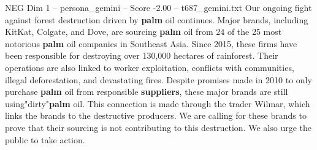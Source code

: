 \begin{textsample}{NEG Dim 1 – persona\_gemini – Score -2.00 – t687\_gemini.txt}  \label{ex:f1_neg_008}
Our ongoing fight against forest destruction driven by \textbf{palm} oil continues.
Major brands, including KitKat, Colgate, and Dove, are sourcing \textbf{palm} oil from 24 of the 25 most notorious \textbf{palm} oil companies in Southeast Asia.
Since 2015, these firms have been responsible for destroying over 130,000 hectares of rainforest.
Their operations are also linked to worker exploitation, conflicts with communities, illegal deforestation, and devastating fires.
Despite promises made in 2010 to only purchase \textbf{palm} oil from responsible \textbf{suppliers}, these major brands are still using"dirty"\textbf{palm} oil.
This connection is made through the trader Wilmar, which links the brands to the destructive producers.
We are calling for these brands to prove that their sourcing is not contributing to this destruction.
We also urge the public to take action.

\end{textsample}
